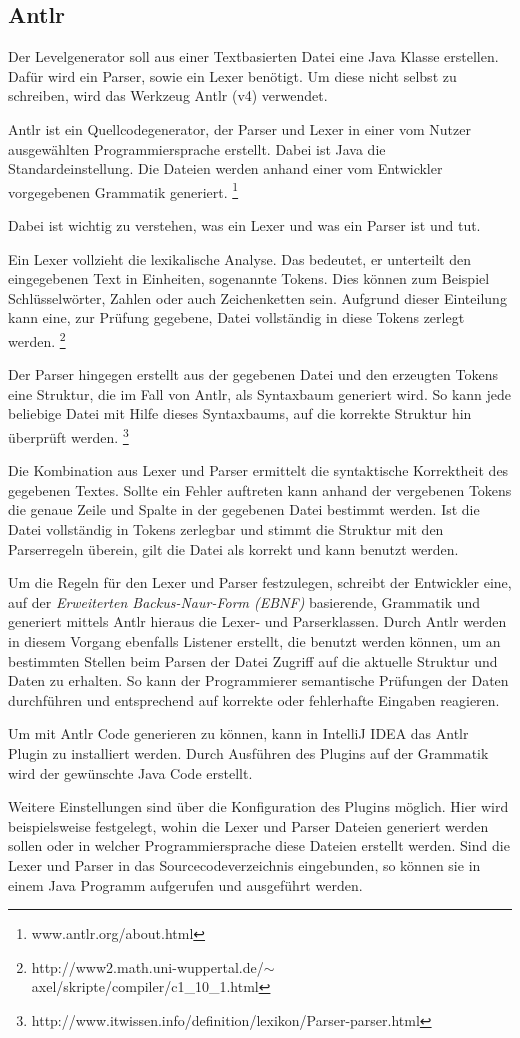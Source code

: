 \subsection{Antlr}

Der Levelgenerator soll aus einer Textbasierten Datei eine Java Klasse erstellen. Dafür wird ein Parser, sowie ein Lexer benötigt. Um diese nicht selbst zu schreiben, wird das Werkzeug Antlr (v4) verwendet.

Antlr ist ein Quellcodegenerator, der Parser und Lexer in einer vom Nutzer ausgewählten Programmiersprache erstellt. Dabei ist Java die Standardeinstellung. Die Dateien werden anhand einer vom Entwickler vorgegebenen Grammatik generiert. \footnote{www.antlr.org/about.html} 

Dabei ist wichtig zu verstehen, was ein Lexer und was ein Parser ist und tut. 

Ein Lexer vollzieht die lexikalische Analyse. Das bedeutet, er unterteilt den eingegebenen Text in Einheiten, sogenannte Tokens. Dies können zum Beispiel Schlüsselwörter, Zahlen oder auch Zeichenketten sein. Aufgrund dieser Einteilung kann eine, zur Prüfung gegebene, Datei vollständig in diese Tokens zerlegt werden. 
\footnote{http://www2.math.uni-wuppertal.de/$\sim$axel/skripte/compiler/c1\_10\_1.html} 

Der Parser hingegen erstellt aus der gegebenen Datei und den erzeugten Tokens eine Struktur, die im Fall von Antlr, als Syntaxbaum generiert wird. So kann jede beliebige Datei mit Hilfe dieses Syntaxbaums, auf die korrekte Struktur hin überprüft werden. \footnote{http://www.itwissen.info/definition/lexikon/Parser-parser.html}

Die Kombination aus Lexer und Parser ermittelt die syntaktische Korrektheit des gegebenen Textes. Sollte ein Fehler auftreten kann anhand der vergebenen Tokens die genaue Zeile und Spalte in der gegebenen Datei bestimmt werden. Ist die Datei vollständig in Tokens zerlegbar und stimmt die Struktur mit den Parserregeln überein, gilt die Datei als korrekt und kann benutzt werden.

Um die Regeln für den Lexer und Parser festzulegen, schreibt der Entwickler eine, auf der \textit{Erweiterten Backus-Naur-Form (EBNF)} basierende, Grammatik und generiert mittels Antlr hieraus die Lexer- und Parserklassen. Durch Antlr werden in diesem Vorgang ebenfalls Listener erstellt, die benutzt werden können, um an bestimmten Stellen beim Parsen der Datei Zugriff auf die aktuelle Struktur und Daten zu erhalten. So kann der Programmierer semantische Prüfungen der Daten durchführen und entsprechend auf korrekte oder fehlerhafte Eingaben reagieren.

Um mit Antlr Code generieren zu können, kann in IntelliJ IDEA das Antlr Plugin zu installiert werden. Durch Ausführen des Plugins auf der Grammatik wird der gewünschte Java Code erstellt.

Weitere Einstellungen sind über die Konfiguration des Plugins möglich. Hier wird beispielsweise festgelegt, wohin die Lexer und Parser Dateien generiert werden sollen oder in welcher Programmiersprache diese Dateien erstellt werden. 
Sind die Lexer und Parser in das Sourcecodeverzeichnis eingebunden, so können sie in einem Java Programm aufgerufen und ausgeführt werden.
